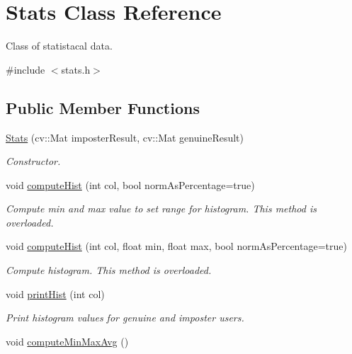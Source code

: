 \hypertarget{class_stats}{\section{Stats Class Reference}
\label{class_stats}
}


Class of statistacal data.  




{\ttfamily \#include $<$stats.\+h$>$}

\subsection*{Public Member Functions}
\begin{DoxyCompactItemize}
\item 
\hyperlink{class_stats_aa82b4e692bf11102c4fb0f74b5cae157}{Stats} (cv\+::\+Mat imposter\+Result, cv\+::\+Mat genuine\+Result)
\begin{DoxyCompactList}\small\item\em Constructor. \end{DoxyCompactList}\item 
void \hyperlink{class_stats_a91c0ad0cbb9624758be71c8c1e8da512}{compute\+Hist} (int col, bool norm\+As\+Percentage=true)
\begin{DoxyCompactList}\small\item\em Compute min and max value to set range for histogram. This method is overloaded. \end{DoxyCompactList}\item 
void \hyperlink{class_stats_a4b7b039369d8ea1c979ab1f1fdb16f19}{compute\+Hist} (int col, float min, float max, bool norm\+As\+Percentage=true)
\begin{DoxyCompactList}\small\item\em Compute histogram. This method is overloaded. \end{DoxyCompactList}\item 
void \hyperlink{class_stats_afa92f0a16604f8cd777dd656da1743ed}{print\+Hist} (int col)
\begin{DoxyCompactList}\small\item\em Print histogram values for genuine and imposter users. \end{DoxyCompactList}\item 
\hypertarget{class_stats_a0ed0cc0e711c63cf6eee1448a1ffb4d7}{void \hyperlink{class_stats_a0ed0cc0e711c63cf6eee1448a1ffb4d7}{compute\+Min\+Max\+Avg} ()}\label{class_stats_a0ed0cc0e711c63cf6eee1448a1ffb4d7}


\end{DoxyCompactItemize}
